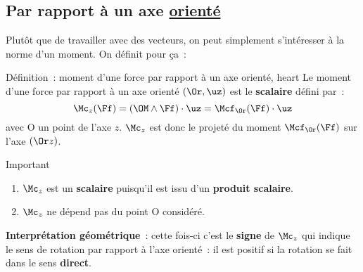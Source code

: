 \documentclass[../main/main.tex]{subfiles}
\begin{document}
\subsection{Par rapport à un axe \ul{orienté}}
Plutôt que de travailler avec des vecteurs, on peut simplement s'intéresser à la
norme d'un moment. On définit pour ça~:
\begin{tdefi}{Définition~: moment d'une force par rapport à un axe orienté,
    heart}
    Le moment d'une force par rapport à un axe orienté $(\Or,\uz)$ est le
    \textbf{scalaire} défini par~:
    \[\Mc_z(\Ff) = \left(\OM\wedge\Ff\right)\cdot\uz = \Mcf_{\Or}(\Ff)\cdot\uz\]
    avec O un point de l'axe $z$. $\Mc_z$ est donc le projeté du moment
    $\Mcf_{\Or}(\Ff)$ sur l'axe $(\Or z)$.
\end{tdefi}
\begin{rimpo}{Important}
    \begin{enumerate}
        \item $\Mc_z$ est un \textbf{scalaire} puisqu'il est issu d'un
            \textbf{produit scalaire}.
        \item $\Mc_z$ ne dépend pas du point O considéré.
    \end{enumerate}
\end{rimpo}
\textbf{Interprétation géométrique}~: cette fois-ci c'est le \textbf{signe} de
$\Mc_z$ qui indique le sens de rotation par rapport à l'axe orienté~: il est
positif si la rotation se fait dans le sens \textbf{direct}.
\end{document}
